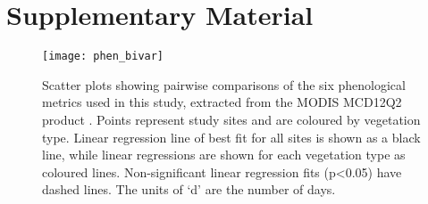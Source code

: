 \documentclass[11pt,a4paper]{article}
\newcommand{\beginsupplement}{%
	\setcounter{table}{0}
	\renewcommand{\thetable}{S\arabic{table}}%
	\setcounter{figure}{0}
	\renewcommand{\thefigure}{S\arabic{figure}}%
	}
\begin{document}
\printbibliography

\section{Supplementary Material}
\beginsupplement

\begin{figure}[H]
\centering
	\texttt{[image: phen\_bivar]}
	\caption{Scatter plots showing pairwise comparisons of the six phenological
		metrics used in this study, extracted from the MODIS MCD12Q2 product
		\citep{MCD12Q2}. Points represent study sites and are coloured by vegetation
		type. Linear regression line of best fit for all sites is shown as a black
		line, while linear regressions are shown for each vegetation type as coloured
		lines. Non-significant linear regression fits (p<0.05) have dashed lines. The
		units of `d' are the number of days.}
	\label{phen_bivar}
\end{figure}

\begin{landscape}

\end{landscape}
\end{document}
